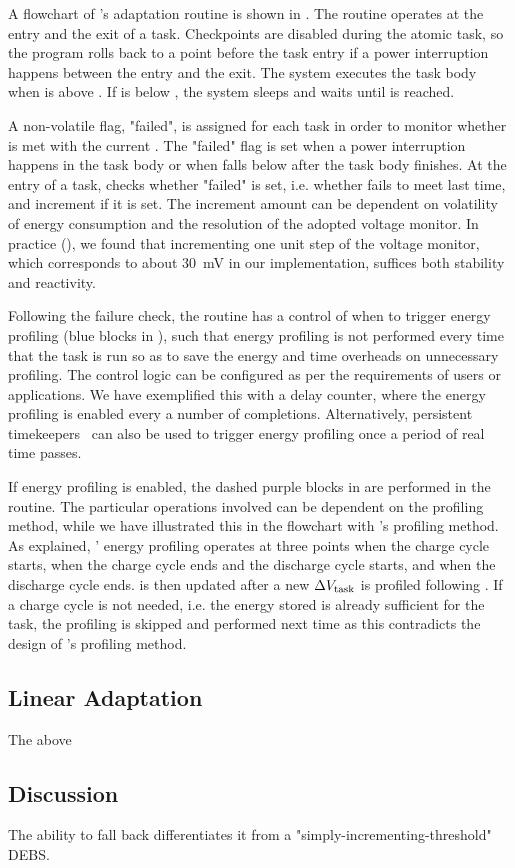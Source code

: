 A flowchart of \nn{}'s adaptation routine is shown in .
The routine operates at the entry and the exit of a task.
Checkpoints are disabled during the atomic task, so the program rolls back to a point before the task entry if a power interruption happens between the entry and the exit.
The system executes the task body when  is above . If  is below , the system sleeps and waits until  is reached.

A non-volatile flag, "failed", is assigned for each task in order to monitor whether  is met with the current .
The "failed" flag is set when a power interruption happens in the task body or when  falls below  after the task body finishes. 
At the entry of a task, \nn{} checks whether "failed" is set, i.e. whether  fails to meet  last time, and increment  if it is set. 
The increment amount can be dependent on volatility of energy consumption and the resolution of the adopted voltage monitor. 
In practice (), we found that incrementing one unit step of the voltage monitor, which corresponds to about \SI{30}{\milli\volt} in our implementation, suffices both stability and reactivity. 

Following the failure check, the routine has a control of when to trigger energy profiling (blue blocks in ), such that energy profiling is not performed every time that the task is run so as to save the energy and time overheads on unnecessary profiling. 
The control logic can be configured as per the requirements of users or applications. 
We have exemplified this with a delay counter, where the energy profiling is enabled every a number of completions. 
Alternatively, persistent timekeepers~\cite{winkel2020reliable, deep2020harc, hester2016persistent} can also be used to trigger energy profiling once a period of real time passes.

If energy profiling is enabled, the dashed purple blocks in  are performed in the routine. 
The particular operations involved can be dependent on the profiling method, while we have illustrated this in the flowchart with \nn{}'s profiling method. 
As explained, \nn{}' energy profiling operates at three points when the charge cycle starts, when the charge cycle ends and the discharge cycle starts, and when the discharge cycle ends. 
 is then updated after a new $\Delta V_{\text{task}}$ is profiled following . 
If a charge cycle is not needed, i.e. the energy stored is already sufficient for the task, the profiling is skipped and performed next time as this contradicts the design of \nn{}'s profiling method.

\subsection{Linear Adaptation}

The above 

\subsection{Discussion}

The ability to fall back differentiates it from a "simply-incrementing-threshold" DEBS.
